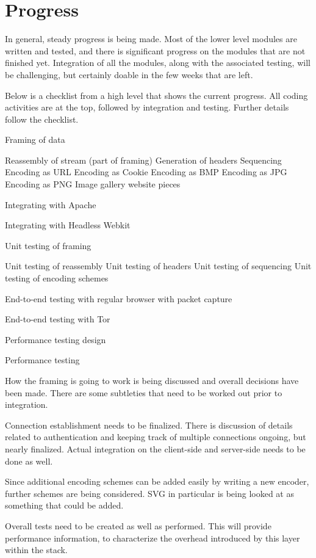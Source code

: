 \section{Progress}

In general, steady progress is being made. Most of the lower level modules are written and tested, and there is significant progress on the modules that are not finished yet. Integration of all the modules, along with the associated testing, will be challenging, but certainly doable in the few weeks that are left. 

Below is a checklist from a high level that shows the current progress. All coding activities are at the top, followed by integration and testing. Further details follow the checklist.

\begin{checklist}
  \item Framing of data
  \item Reassembly of stream (part of framing)
  \checkeditem Generation of headers
  \checkeditem Sequencing
  \checkeditem Encoding as URL
  \checkeditem Encoding as Cookie
  \checkeditem Encoding as BMP
  \checkeditem Encoding as JPG
  \checkeditem Encoding as PNG
  \checkeditem Image gallery website pieces
  \item Integrating with Apache
  \item Integrating with Headless Webkit
  \item Unit testing of framing
  \item Unit testing of reassembly
  \checkeditem Unit testing of headers
  \checkeditem Unit testing of sequencing
  \checkeditem Unit testing of encoding schemes
  \item End-to-end testing with regular browser with packet capture
  \item End-to-end testing with Tor
  \item Performance testing design
  \item Performance testing
\end{checklist}

How the framing is going to work is being discussed and overall decisions have been made. There are some subtleties that need to be worked out prior to integration.

Connection establishment needs to be finalized. There is discussion of details related to authentication and keeping track of multiple connections ongoing, but nearly finalized. Actual integration on the client-side and server-side needs to be done as well.

Since additional encoding schemes can be added easily by writing a new encoder, further schemes are being considered. SVG in particular is being looked at as something that could be added.

Overall tests need to be created as well as performed. This will provide performance information, to characterize the overhead introduced by this layer within the stack.
